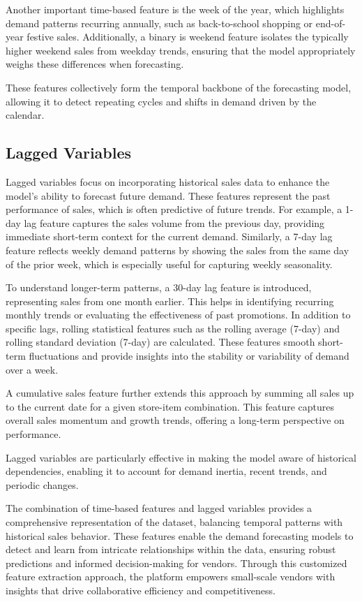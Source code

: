 Another important time-based feature is the week of the year, which highlights demand patterns recurring annually, such as back-to-school shopping or end-of-year festive sales. Additionally, a binary is weekend feature isolates the typically higher weekend sales from weekday trends, ensuring that the model appropriately weighs these differences when forecasting.

These features collectively form the temporal backbone of the forecasting model, allowing it to detect repeating cycles and shifts in demand driven by the calendar.

\subsection{Lagged Variables}

Lagged variables focus on incorporating historical sales data to enhance the model’s ability to forecast future demand. These features represent the past performance of sales, which is often predictive of future trends. For example, a 1-day lag feature captures the sales volume from the previous day, providing immediate short-term context for the current demand. Similarly, a 7-day lag feature reflects weekly demand patterns by showing the sales from the same day of the prior week, which is especially useful for capturing weekly seasonality.

To understand longer-term patterns, a 30-day lag feature is introduced, representing sales from one month earlier. This helps in identifying recurring monthly trends or evaluating the effectiveness of past promotions. In addition to specific lags, rolling statistical features such as the rolling average (7-day) and rolling standard deviation (7-day) are calculated. These features smooth short-term fluctuations and provide insights into the stability or variability of demand over a week.

A cumulative sales feature further extends this approach by summing all sales up to the current date for a given store-item combination. This feature captures overall sales momentum and growth trends, offering a long-term perspective on performance.

Lagged variables are particularly effective in making the model aware of historical dependencies, enabling it to account for demand inertia, recent trends, and periodic changes.


The combination of time-based features and lagged variables provides a comprehensive representation of the dataset, balancing temporal patterns with historical sales behavior. These features enable the demand forecasting models to detect and learn from intricate relationships within the data, ensuring robust predictions and informed decision-making for vendors. Through this customized feature extraction approach, the platform empowers small-scale vendors with insights that drive collaborative efficiency and competitiveness.

